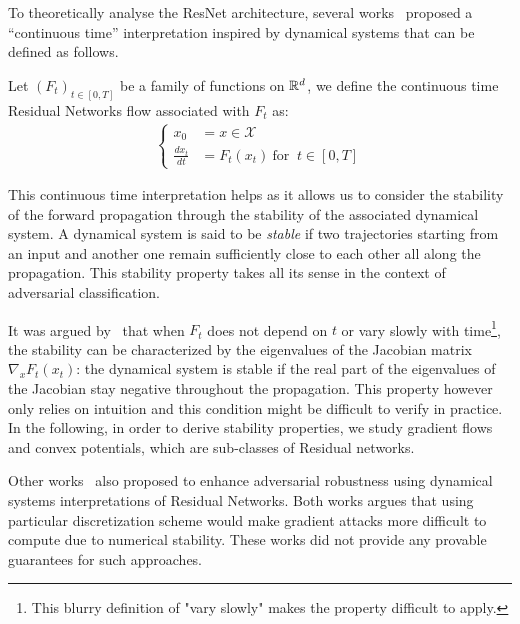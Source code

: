 To theoretically analyse the ResNet architecture, several works~\citep{haber2017stable,e17Proposal,lu18beyond,chen2018neural} proposed a ``continuous time'' interpretation inspired by dynamical systems that can be defined as follows.

\begin{definition}\label{def:flow}
Let $(F_{t})_{t\in[0,T]}$ be a family of functions on $\mathbb{R}^d$, we define the continuous time Residual Networks flow associated with $F_t$ as:
\begin{align*}
  \left\{
    \begin{array}{ll}
    x_0 &= x\in\mathcal{X}\\
    \frac{dx_{t}}{dt} &= F_{{t}}(x_{t}) \  \text{for } \ t\in[0, T]
  \end{array}
  \right.
\end{align*}
\end{definition}

This continuous time interpretation helps as it allows us to consider the stability of the forward propagation through the stability of the associated dynamical system.
A dynamical system is said to be \emph{stable} if two trajectories starting from an input and another one remain sufficiently close to each other all along the propagation. This stability property takes all its sense in the context of adversarial classification.

It was argued by~\citet{haber2017stable} that when $F_{t}$ does not depend on $t$ or vary slowly with time\footnote{This blurry definition of "vary slowly" makes the property difficult to apply.}, the stability can be characterized by the eigenvalues of the Jacobian matrix $\nabla_x F_{t}(x_t)$: 
the dynamical system is stable if the real part of the eigenvalues of the Jacobian stay negative throughout the propagation.
This property however only relies on intuition and this condition might be difficult to  verify in practice.
In the following, in order to derive stability properties, we study gradient flows and convex potentials, which are sub-classes of Residual networks.

Other works~\citep{huang2020adversarial,li2020implicit} also proposed to enhance adversarial robustness using dynamical systems interpretations of Residual Networks. Both works argues that using particular discretization scheme would make gradient attacks more difficult to compute due to numerical stability. These works did not provide any provable guarantees for such approaches.



